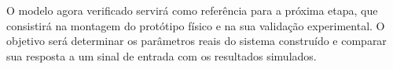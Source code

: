 \documentclass[9pt,a4paper,twocolumn,twoside]{tau-class/tau}
\begin{document}
 O modelo agora verificado servirá como referência para a próxima etapa, que consistirá na montagem do protótipo físico e na sua validação experimental. O objetivo será determinar os parâmetros reais do sistema construído e comparar sua resposta a um sinal de entrada com os resultados simulados.



\printbibliography

\end{document}
